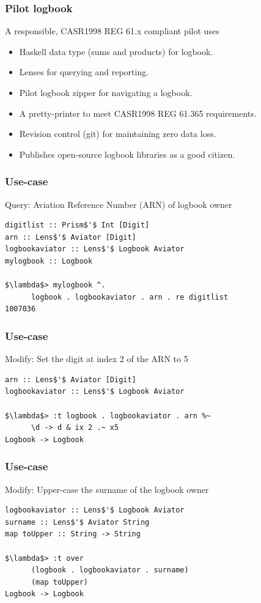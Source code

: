 \begin{frame}
\frametitle{Pilot logbook}
\begin{block}{A responsible, CASR1998 REG 61.x compliant pilot uses}
\begin{itemize}
\item<1-> Haskell data type (sums and products) for logbook.
\item<1-> Lenses for querying and reporting.
\item<1-> Pilot logbook zipper for navigating a logbook.
\item<1-> A pretty-printer to meet CASR1998 REG 61.365 requirements.
\item<1-> Revision control (git) for maintaining zero data loss.
\item<1-> Publishes open-source logbook libraries as a good citizen.
\end{itemize}
\end{block}
\end{frame}

\begin{frame}[fragile]
\frametitle{Use-case}
\begin{block}{Query: Aviation Reference Number (ARN) of logbook owner}
\begin{lstlisting}[style=haskell,basicstyle=\scriptsize\ttfamily,mathescape]
digitlist :: Prism$'$ Int [Digit]
arn :: Lens$'$ Aviator [Digit]
logbookaviator :: Lens$'$ Logbook Aviator
mylogbook :: Logbook

$\lambda$> mylogbook ^.
      logbook . logbookaviator . arn . re digitlist
1007036
\end{lstlisting}
\end{block}
\end{frame}

\begin{frame}[fragile]
\frametitle{Use-case}
\begin{block}{Modify: Set the digit at index 2 of the ARN to 5}
\begin{lstlisting}[style=haskell,basicstyle=\scriptsize\ttfamily,mathescape]
arn :: Lens$'$ Aviator [Digit]
logbookaviator :: Lens$'$ Logbook Aviator

$\lambda$> :t logbook . logbookaviator . arn %~
      \d -> d & ix 2 .~ x5
Logbook -> Logbook
\end{lstlisting}
\end{block}
\end{frame}

\begin{frame}[fragile]
\frametitle{Use-case}
\begin{block}{Modify: Upper-case the surname of the logbook owner}
\begin{lstlisting}[style=haskell,basicstyle=\scriptsize\ttfamily,mathescape]
logbookaviator :: Lens$'$ Logbook Aviator
surname :: Lens$'$ Aviator String
map toUpper :: String -> String

$\lambda$> :t over
      (logbook . logbookaviator . surname)
      (map toUpper)
Logbook -> Logbook
\end{lstlisting}
\end{block}
\end{frame}

